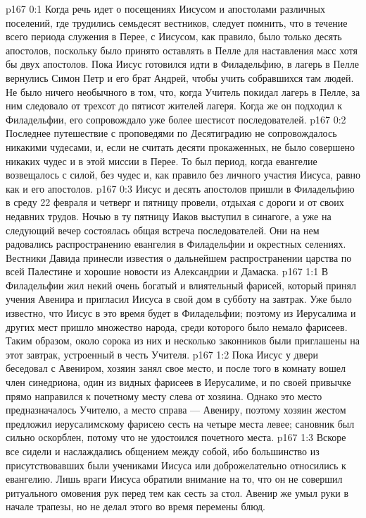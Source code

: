 \author{Комиссия срединников}
\vs p167 0:1 Когда речь идет о посещениях Иисусом и апостолами различных поселений, где трудились семьдесят вестников, следует помнить, что в течение всего периода служения в Перее, с Иисусом, как правило, было только десять апостолов, поскольку было принято оставлять в Пелле для наставления масс хотя бы двух апостолов. Пока Иисус готовился идти в Филадельфию, в лагерь в Пелле вернулись Симон Петр и его брат Андрей, чтобы учить собравшихся там людей. Не было ничего необычного в том, что, когда Учитель покидал лагерь в Пелле, за ним следовало от трехсот до пятисот жителей лагеря. Когда же он подходил к Филадельфии, его сопровождало уже более шестисот последователей.
\vs p167 0:2 Последнее путешествие с проповедями по Десятиградию не сопровождалось никакими чудесами, и, если не считать десяти прокаженных, не было совершено никаких чудес и в этой миссии в Перее. То был период, когда евангелие возвещалось с силой, без чудес и, как правило без личного участия Иисуса, равно как и его апостолов.
\vs p167 0:3 \pc Иисус и десять апостолов пришли в Филадельфию в среду 22 февраля и четверг и пятницу провели, отдыхая с дороги и от своих недавних трудов. Ночью в ту пятницу Иаков выступил в синагоге, а уже на следующий вечер состоялась общая встреча последователей. Они на нем радовались распространению евангелия в Филадельфии и окрестных селениях. Вестники Давида принесли известия о дальнейшем распространении царства по всей Палестине и хорошие новости из Александрии и Дамаска.
\vs p167 1:1 В Филадельфии жил некий очень богатый и влиятельный фарисей, который принял учения Авенира и пригласил Иисуса в свой дом в субботу на завтрак. Уже было известно, что Иисус в это время будет в Филадельфии; поэтому из Иерусалима и других мест пришло множество народа, среди которого было немало фарисеев. Таким образом, около сорока из них и несколько законников были приглашены на этот завтрак, устроенный в честь Учителя.
\vs p167 1:2 Пока Иисус у двери беседовал с Авениром, хозяин занял свое место, и после того в комнату вошел член синедриона, один из видных фарисеев в Иерусалиме, и по своей привычке прямо направился к почетному месту слева от хозяина. Однако это место предназначалось Учителю, а место справа --- Авениру, поэтому хозяин жестом предложил иерусалимскому фарисею сесть на четыре места левее; сановник был сильно оскорблен, потому что не удостоился почетного места.
\vs p167 1:3 Вскоре все сидели и наслаждались общением между собой, ибо большинство из присутствовавших были учениками Иисуса или доброжелательно относились к евангелию. Лишь враги Иисуса обратили внимание на то, что он не совершил ритуального омовения рук перед тем как сесть за стол. Авенир же умыл руки в начале трапезы, но не делал этого во время перемены блюд.
